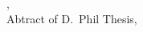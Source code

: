 \begin{center}
  {\Large \bf \thesistitle} \\[0.25cm]
  {\authorname, \collegename} \\
  {Abtract of D.\ Phil Thesis, \DPhildate} \\[1.0cm]
\end{center}

\abstext

